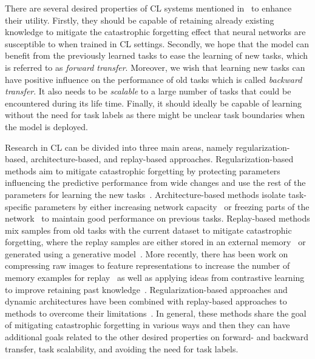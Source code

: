 There are several desired properties of CL systems mentioned in~\cite{schwarz2018progress} to enhance their utility. Firstly, they should be capable of retaining already existing knowledge to mitigate the catastrophic forgetting effect that neural networks are susceptible to when trained in CL settings. Secondly, we hope that the model can benefit from the previously learned tasks to ease the learning of new tasks, which is referred to as \textit{forward transfer}. Moreover, we wish that learning new tasks can have positive influence on the performance of old tasks which is called \textit{backward transfer}. It also needs to be \textit{scalable} to a large number of tasks that could be encountered during its life time. Finally, it should ideally be capable of learning without the need for task labels as there might be unclear task boundaries when the model is deployed. 

Research in CL can be divided into three main areas, namely regularization-based, architecture-based, and replay-based approaches. Regularization-based methods aim to mitigate catastrophic forgetting by protecting parameters influencing the predictive performance from wide changes and use the rest of the parameters for learning the new tasks~\cite{adel2019continual, chaudhry2018riemannian, kirkpatrick2017overcoming, li2017learning, nguyen2017variational, rannen2017encoder, schwarz2018progress, zenke2017continual}. Architecture-based methods isolate task-specific parameters by either increasing network capacity~\cite{rusu2016progressive, yoon2019scalable, yoon2017lifelong} or freezing parts of the network~\cite{mallya2018packnet, serra2018overcoming} to maintain good performance on previous tasks. 
Replay-based methods mix samples from old tasks with the current dataset to mitigate catastrophic forgetting, where the replay samples are either stored in an external memory~\cite{chaudhry2019tiny, hayes2020remind, isele2018selective, lopez2017gradient} or generated using a generative model~\cite{shin2017continual, van2018generative}. More recently, there has been work on compressing raw images to feature representations to increase the number of memory examples for replay~\cite{hayes2020remind, iscen2020memory, pellegrini2019latent} as well as applying ideas from contrastive learning to improve retaining past knowledge~\cite{cha2021co2l, mai2021supervised}. 
Regularization-based approaches and dynamic architectures have been combined with replay-based approaches to methods to overcome their limitations~\cite{chaudhry2018riemannian, chaudhry2018efficient, douillard2020podnet, ebrahimi2020adversarial, joseph2020meta, mirzadeh2020linear, nguyen2017variational, pan2020continual, pellegrini2019latent, rolnick2018experience, von2019continual}. In general, these methods share the goal of mitigating catastrophic forgetting in various ways and then they can have additional goals related to the other desired properties on forward- and backward transfer, task scalability, and avoiding the need for task labels. 

